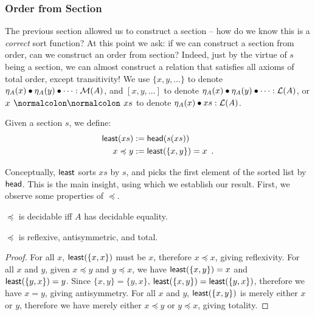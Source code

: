 \subsubsection{Order from Section}

The previous section allowed us to construct a section -- how do we know this is a \emph{correct} sort function?
%
At this point we ask: if we can construct a section from order, can we construct an order from section?
%
Indeed, just by the virtue of $s$ being a section, we can almost construct a relation that satisfies
all axioms of total order, except transitivity!
We use $\{x,y,\dots\}$ to denote $\eta_A(x) \mathbin{\bullet} \eta_A(y) \mathbin{\bullet} \dots : \mathcal{M}(A)$,
and $[x, y, \dots]$ to denote $\eta_A(x) \mathbin{\bullet} \eta_A(y) \mathbin{\bullet} \dots : \mathcal{L}(A)$,
or $x \cons xs$ to denote $\eta_A(x) \mathbin{\bullet} xs : \mathcal{L}(A)$.

\begin{definition}
    \label{def:least}
    Given a section $s$, we define:
    \[
        \begin{aligned}
            \operatorname{\mathsf{least}}(xs) & := \operatorname{\mathsf{head}}(s(xs))                    \\
            x \preccurlyeq y & := \operatorname{\mathsf{least}}(\{x, y\}) = x \enspace .
        \end{aligned}
    \]
\end{definition}

Conceptually, $\operatorname{\mathsf{least}}$ sorts $xs$ by $s$, and picks the first element of the sorted list by~$\operatorname{\mathsf{head}}$.
This is the main insight, using which we establish our result.
First, we observe some properties of $\preccurlyeq$.

\begin{proposition}
    $\preccurlyeq$ is decidable iff $A$ has decidable equality.
\end{proposition}

\begin{proposition}\label{sort:almost-total}
    $\preccurlyeq$ is reflexive, antisymmetric, and total.
\end{proposition}
\begin{proof}
    For all $x$, $\operatorname{\mathsf{least}}(\{x, x\})$ must be $x$, therefore $x \preccurlyeq x$, giving reflexivity.
    For all $x$ and $y$, given $x \preccurlyeq y$ and $y \preccurlyeq x$,
    we have $\operatorname{\mathsf{least}}(\{x, y\}) = x$ and $\operatorname{\mathsf{least}}(\{y, x\}) = y$.
    Since $\{x, y\} = \{y, x\}$, $\operatorname{\mathsf{least}}(\{x, y\}) = \operatorname{\mathsf{least}}(\{y, x\})$,
    therefore we have $x = y$, giving antisymmetry.
    For all $x$ and $y$, $\operatorname{\mathsf{least}}(\{x, y\})$ is merely either $x$ or $y$,
    therefore we have merely either $x \preccurlyeq y$ or $y \preccurlyeq x$, giving totality.
\end{proof}

